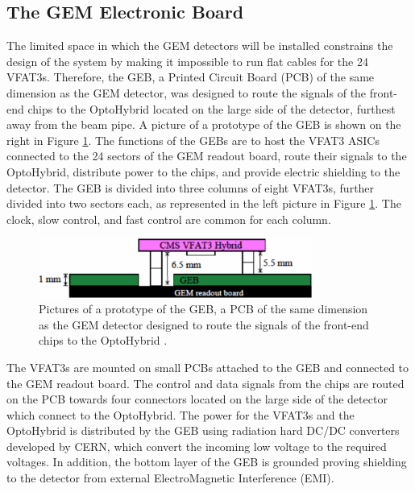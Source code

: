     \subsection{The GEM Electronic Board}

      The limited space in which the GEM detectors will be installed constrains the design of the system by making it impossible to run flat cables for the 24 VFAT3s. Therefore, the GEB, a Printed Circuit Board (PCB) of the same dimension as the GEM detector, was designed to route the signals of the front-end chips to the OptoHybrid located on the large side of the detector, furthest away from the beam pipe. A picture of a prototype of the GEB is shown on the right in Figure \ref{fig:II-2-geb}. The functions of the GEBs are to host the VFAT3 ASICs connected to the 24 sectors of the GEM readout board, route their signals to the OptoHybrid, distribute power to the chips, and provide electric shielding to the detector. The GEB is divided into three columns of eight VFAT3s, further divided into two sectors each, as represented in the left picture in Figure \ref{fig:II-2-geb}. The clock, slow control, and fast control are common for each column. \\

      \begin{figure}[h!]
        \centering
        \includegraphics[width=0.8\textwidth]{img/II-2-daq/geb.pdf}
        \caption{Pictures of a prototype of the GEB, a PCB of the same dimension as the GEM detector  designed to route the signals of the front-end chips to the OptoHybrid \cite{Colaleo:2021453}.}
        \label{fig:II-2-geb}
      \end{figure}

      The VFAT3s are mounted on small PCBs attached to the GEB and connected to the GEM readout board. The control and data signals from the chips are routed on the PCB towards four connectors located on the large side of the detector which connect to the OptoHybrid. The power for the VFAT3s and the OptoHybrid is distributed by the GEB using radiation hard DC/DC converters developed by CERN, which convert the incoming low voltage to the required voltages. In addition, the bottom layer of the GEB is grounded proving shielding to the detector from external ElectroMagnetic Interference (EMI).

